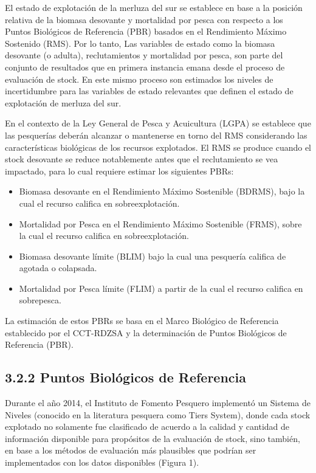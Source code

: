 \documentclass[
  spanish,
]{article}
\providecommand{\tightlist}{%
  \setlength{\itemsep}{0pt}\setlength{\parskip}{0pt}}
\begin{document}
El estado de explotación de la merluza del sur se establece en base a la
posición relativa de la biomasa desovante y mortalidad por pesca con
respecto a los Puntos Biológicos de Referencia (PBR) basados en el
Rendimiento Máximo Sostenido (RMS). Por lo tanto, Las variables de
estado como la biomasa desovante (o adulta), reclutamientos y mortalidad
por pesca, son parte del conjunto de resultados que en primera instancia
emana desde el proceso de evaluación de stock. En este mismo proceso son
estimados los niveles de incertidumbre para las variables de estado
relevantes que definen el estado de explotación de merluza del sur.

En el contexto de la Ley General de Pesca y Acuicultura (LGPA) se
establece que las pesquerías deberán alcanzar o mantenerse en torno del
RMS considerando las características biológicas de los recursos
explotados. El RMS se produce cuando el stock desovante se reduce
notablemente antes que el reclutamiento se vea impactado, para lo cual
requiere estimar los siguientes PBRs:

\begin{itemize}
\tightlist
\item
  Biomasa desovante en el Rendimiento Máximo Sostenible (BDRMS), bajo la
  cual el recurso califica en sobreexplotación.
\item
  Mortalidad por Pesca en el Rendimiento Máximo Sostenible (FRMS), sobre
  la cual el recurso califica en sobreexplotación.
\item
  Biomasa desovante límite (BLIM) bajo la cual una pesquería califica de
  agotada o colapsada.
\item
  Mortalidad por Pesca límite (FLIM) a partir de la cual el recurso
  califica en sobrepesca.
\end{itemize}

La estimación de estos PBRs se basa en el Marco Biológico de Referencia
establecido por el CCT-RDZSA y la determinación de Puntos Biológicos de
Referencia (PBR).

\hypertarget{puntos-bioluxf3gicos-de-referencia}{%
\subsection{3.2.2 Puntos Biológicos de
Referencia}\label{puntos-bioluxf3gicos-de-referencia}}

Durante el año 2014, el Instituto de Fomento Pesquero implementó un
Sistema de Niveles (conocido en la literatura pesquera como Tiers
System), donde cada stock explotado no solamente fue clasificado de
acuerdo a la calidad y cantidad de información disponible para
propósitos de la evaluación de stock, sino también, en base a los
métodos de evaluación más plausibles que podrían ser implementados con
los datos disponibles (Figura 1).
\end{document}
